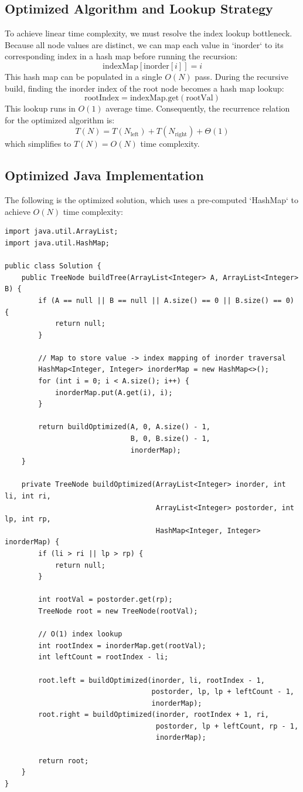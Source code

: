 \documentclass[10pt,journal,compsoc,onecolumn]{IEEEtran}
\begin{document}
\subsection{Optimized Algorithm and Lookup Strategy}
To achieve linear time complexity, we must resolve the index lookup bottleneck. Because all node values are distinct, we can map each value in `inorder` to its corresponding index in a hash map before running the recursion:
\[
\text{indexMap}[\text{inorder}[i]] = i
\]
This hash map can be populated in a single $O(N)$ pass. During the recursive build, finding the inorder index of the root node becomes a hash map lookup:
\[
\text{rootIndex} = \text{indexMap}.\text{get}(\text{rootVal})
\]
This lookup runs in $O(1)$ average time. Consequently, the recurrence relation for the optimized algorithm is:
\[
T(N) = T(N_{\text{left}}) + T(N_{\text{right}}) + \Theta(1)
\]
which simplifies to $T(N) = O(N)$ time complexity.

\subsection{Optimized Java Implementation}
The following is the optimized solution, which uses a pre-computed `HashMap` to achieve $O(N)$ time complexity:

\begin{verbatim}
import java.util.ArrayList;
import java.util.HashMap;

public class Solution {
    public TreeNode buildTree(ArrayList<Integer> A, ArrayList<Integer> B) {
        if (A == null || B == null || A.size() == 0 || B.size() == 0) {
            return null;
        }
        
        // Map to store value -> index mapping of inorder traversal
        HashMap<Integer, Integer> inorderMap = new HashMap<>();
        for (int i = 0; i < A.size(); i++) {
            inorderMap.put(A.get(i), i);
        }
        
        return buildOptimized(A, 0, A.size() - 1, 
                              B, 0, B.size() - 1, 
                              inorderMap);
    }

    private TreeNode buildOptimized(ArrayList<Integer> inorder, int li, int ri,
                                    ArrayList<Integer> postorder, int lp, int rp,
                                    HashMap<Integer, Integer> inorderMap) {
        if (li > ri || lp > rp) {
            return null;
        }

        int rootVal = postorder.get(rp);
        TreeNode root = new TreeNode(rootVal);

        // O(1) index lookup
        int rootIndex = inorderMap.get(rootVal);
        int leftCount = rootIndex - li;

        root.left = buildOptimized(inorder, li, rootIndex - 1,
                                   postorder, lp, lp + leftCount - 1,
                                   inorderMap);
        root.right = buildOptimized(inorder, rootIndex + 1, ri,
                                    postorder, lp + leftCount, rp - 1,
                                    inorderMap);

        return root;
    }
}
\end{verbatim}
\end{document}
